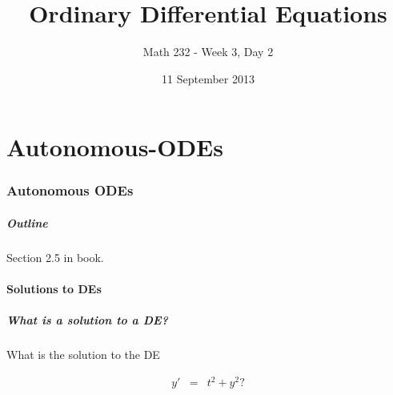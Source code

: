\part{Autonomous-ODEs}
\section{Autonomous ODEs}

\title{Ordinary Differential Equations}
\subtitle{Math 232 - Week 3, Day 2}
\date{11 September 2013}

\begin{frame}
  \titlepage
\end{frame}

\begin{frame}
  \frametitle{Outline}
  \tableofcontents[currentsection]

  Section 2.5 in book.
\end{frame}


\subsection{Solutions to DEs}


\begin{frame}
  \frametitle{What is a solution to a DE?}

  What is the solution to the DE

  \begin{eqnarray*}
    y' & = & t^2 + y^2?
  \end{eqnarray*}



\end{frame}


